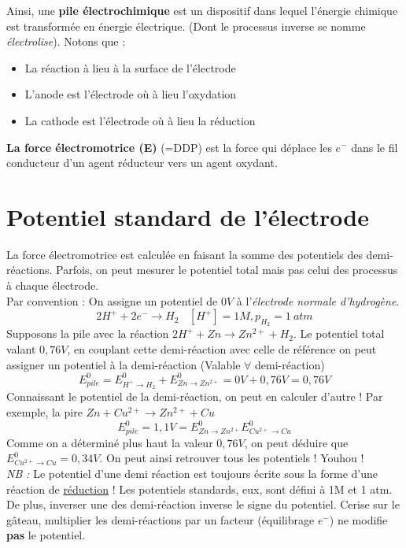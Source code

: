 \documentclass	[11pt, a4paper, openany]{book}
\begin{document}
Ainsi, une \textbf{pile électrochimique} est un dispositif dans lequel l'énergie chimique est transformée en énergie électrique. (Dont le processus inverse se nomme \textit{électrolise}). Notons que :
\begin{itemize}
	\item La réaction à lieu à la surface de l'électrode
	\item L'anode est l'électrode où à lieu l'oxydation
	\item La cathode est l'électrode où à lieu la réduction
\end{itemize}
\textbf{La force électromotrice (E)} (=DDP) est la force qui déplace les $e^-$ dans le fil conducteur d'un agent réducteur vers un agent oxydant. 

\section{Potentiel standard de l'électrode}
La force électromotrice est calculée en faisant la somme des potentiels des demi-réactions. Parfois, on peut mesurer le potentiel total mais pas celui des processus à chaque électrode.\\
Par convention  : On assigne un potentiel de $0 V$ à l'\textit{électrode normale d'hydrogène}.
$$2H^+ + 2e^- \rightarrow H_2\ \ \ \ [H^+] = 1M, p_{H_2} = 1\ atm$$
Supposons la pile avec la réaction $2H^+ + Zn \rightarrow Zn^{2+} + H_2$. Le potentiel total valant $0,76V$, en couplant cette demi-réaction avec celle de référence on peut assigner un potentiel à la demi-réaction (Valable $\forall$ demi-réaction)
$$E^0_{pile} = E^0_{H^+ \rightarrow H_2} + E^0_{Zn \rightarrow Zn^{2+}} = 0V + 0,76V = 0,76V$$
Connaissant le potentiel de la demi-réaction, on peut en calculer d'autre ! Par exemple, la pire $Zn + Cu^{2+} \rightarrow Zn^{2+} + Cu$
$$E^0_{pile} = 1,1V = E^0_{Zn \rightarrow Zn^{2+}}  E^0_{Cu^{2+} \rightarrow Cu}$$
Comme on a déterminé plus haut la valeur $0,76V$, on peut déduire que $E^0_{Cu^{2+} \rightarrow Cu} = 0,34V$. On peut ainsi retrouver tous les potentiels ! Youhou !\\

\textit{NB :} Le potentiel d'une demi réaction est toujours écrite sous la forme d'une réaction de \underline{réduction} ! Les potentiels standards, eux, sont défini à 1M et 1 atm. \\

De plus, inverser une des demi-réaction inverse le signe du potentiel. Cerise sur le gâteau, multiplier les demi-réactions par un facteur (équilibrage $e^-$) ne modifie \textbf{pas} le potentiel.
\end{document}
